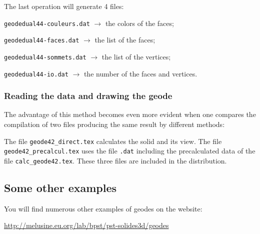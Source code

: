 The last operation will generate 4 files:
\begin{compactitem}
  \item \texttt{geodedual44-couleurs.dat} $\rightarrow$ the colors of the faces;
  \item \texttt{geodedual44-faces.dat} $\rightarrow$ the list of the faces;
  \item \texttt{geodedual44-sommets.dat} $\rightarrow$ the list of the vertices;
  \item \texttt{geodedual44-io.dat} $\rightarrow$ the number of the faces and vertices.
\end{compactitem}


\subsubsection{Reading the data and drawing the geode}


The advantage of this method becomes even more evident when one compares the compilation of two files producing the same result by different methods:

The file \texttt{geode42\_direct.tex} calculates the solid  and its view. The file \texttt{geode42\_precalcul.tex} uses the file
 \texttt{.dat} including the precalculated data of the file
\texttt{calc\_geode42.tex}. These three files are included in the distribution.

\subsection{Some other examples}
You will find numerous other  examples of geodes on the website:

\centerline{\url{http://melusine.eu.org/lab/bpst/pst-solides3d/geodes}}

\endinput
